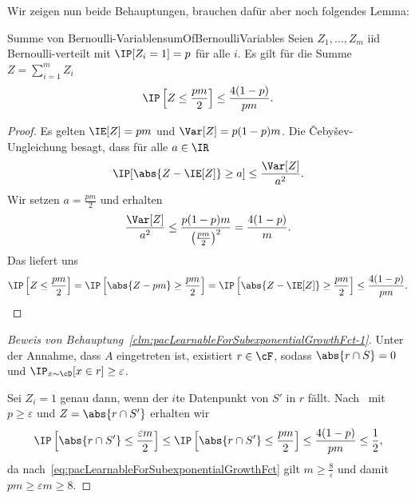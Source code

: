 \documentclass[language=ngerman,algolist,acrolist]{TemplateLecture}
\begin{document}
Wir zeigen nun beide Behauptungen, brauchen dafür aber noch folgendes Lemma:
\begin{lem}{Summe von Bernoulli-Variablen}{sumOfBernoulliVariables}
    Seien $Z_1, \ldots, Z_m$ \ac{iid} Bernoulli-verteilt mit $\IP[Z_i = 1] = p$ für alle $i$. Es gilt für die Summe $Z = \sum_{i = 1}^m Z_i$
    \begin{equation*}
        \IP\left[ Z \leq \frac{pm}{2} \right] \leq \frac{4(1-p)}{pm}.
    \end{equation*}
\end{lem}
\begin{proof}
    Es gelten $\IE[Z] = pm$ und $\Var[Z] = p(1-p)m$. Die \v{C}eby\v{s}ev-Ungleichung besagt, dass für alle $a \in \IR$ 
    \begin{equation*}
        \IP[\abs{Z - \IE[Z]} \geq a] \leq \frac{\Var[Z]}{a^2}.
    \end{equation*}
    Wir setzen $a = \frac{pm}{2}$ und erhalten 
    \begin{equation*}
        \frac{\Var[Z]}{a^2} \leq \frac{p(1-p)m}{\left( \frac{pm}{2} \right)^2} = \frac{4(1-p)}{m}.
    \end{equation*}
    Das liefert uns 
    \begin{equation*}
        \IP\left[ Z \leq \frac{pm}{2} \right] = \IP\left[ \abs{Z - pm} \geq \frac{pm}{2} \right] = \IP\left[ \abs{Z - \IE[Z]} \geq \frac{pm}{2} \right] \leq \frac{4(1 - p)}{pm}. \qedhere
    \end{equation*}
\end{proof}

\begin{proof}[Beweis von Behauptung~\ref{clm:pacLearnableForSubexponentialGrowthFct-1}]
    Unter der Annahme, dass $A$ eingetreten ist, existiert $r \in \cF$, sodass $\abs{r \cap S} = 0$ und $\IP_{x \sim \cD} [x \in r] \geq \varepsilon$.

    Sei $Z_i = 1$ genau dann, wenn der $i$te Datenpunkt von $S'$ in $r$ fällt. Nach~ mit $p \geq \varepsilon$ und $Z = \abs{r \cap S'}$ erhalten wir 
    \begin{equation*}
        \IP\left[ \abs{r \cap S'} \leq \frac{\varepsilon m}{2} \right] \leq \IP\left[ \abs{r \cap S'} \leq \frac{pm}{2} \right] \leq \frac{4(1-p)}{pm} \leq \frac{1}{2},
    \end{equation*}
    da nach~\eqref{eq:pacLearnableForSubexponentialGrowthFct} gilt $m \geq \frac{8}{\varepsilon}$ und damit $pm \geq \varepsilon m \geq 8$.
\end{proof}
\end{document}
